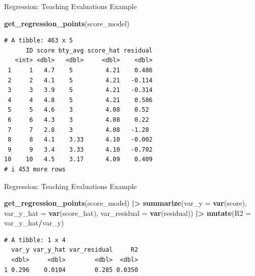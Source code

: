 \documentclass[
  ignorenonframetext,
]{beamer}
\newenvironment{Shaded}{\begin{snugshade}}{\end{snugshade}}
\newcommand{\AttributeTok}[1]{\textcolor[rgb]{0.13,0.29,0.53}{#1}}
\newcommand{\FunctionTok}[1]{\textcolor[rgb]{0.13,0.29,0.53}{\textbf{#1}}}
\newcommand{\NormalTok}[1]{#1}
\newcommand{\SpecialCharTok}[1]{\textcolor[rgb]{0.81,0.36,0.00}{\textbf{#1}}}
\begin{document}
\begin{frame}[fragile]{Regression: Teaching Evaluations Example}
\protect\hypertarget{regression-teaching-evaluations-example-15}{}
\normalsize

\begin{Shaded}
\begin{Highlighting}[]
\FunctionTok{get\_regression\_points}\NormalTok{(score\_model) }
\end{Highlighting}
\end{Shaded}

\begin{verbatim}
# A tibble: 463 x 5
      ID score bty_avg score_hat residual
   <int> <dbl>   <dbl>     <dbl>    <dbl>
 1     1   4.7    5         4.21    0.486
 2     2   4.1    5         4.21   -0.114
 3     3   3.9    5         4.21   -0.314
 4     4   4.8    5         4.21    0.586
 5     5   4.6    3         4.08    0.52 
 6     6   4.3    3         4.08    0.22 
 7     7   2.8    3         4.08   -1.28 
 8     8   4.1    3.33      4.10   -0.002
 9     9   3.4    3.33      4.10   -0.702
10    10   4.5    3.17      4.09    0.409
# i 453 more rows
\end{verbatim}
\end{frame}

\begin{frame}[fragile]{Regression: Teaching Evaluations Example}
\protect\hypertarget{regression-teaching-evaluations-example-16}{}
\small

\begin{Shaded}
\begin{Highlighting}[]
\FunctionTok{get\_regression\_points}\NormalTok{(score\_model) }\SpecialCharTok{|\textgreater{}} 
  \FunctionTok{summarize}\NormalTok{(}\AttributeTok{var\_y =} \FunctionTok{var}\NormalTok{(score), }
            \AttributeTok{var\_y\_hat =} \FunctionTok{var}\NormalTok{(score\_hat), }
            \AttributeTok{var\_residual =} \FunctionTok{var}\NormalTok{(residual)) }\SpecialCharTok{|\textgreater{}} 
  \FunctionTok{mutate}\NormalTok{(}\AttributeTok{R2 =}\NormalTok{ var\_y\_hat}\SpecialCharTok{/}\NormalTok{var\_y)}
\end{Highlighting}
\end{Shaded}

\begin{verbatim}
# A tibble: 1 x 4
  var_y var_y_hat var_residual     R2
  <dbl>     <dbl>        <dbl>  <dbl>
1 0.296    0.0104        0.285 0.0350
\end{verbatim}
\end{frame}
\end{document}
